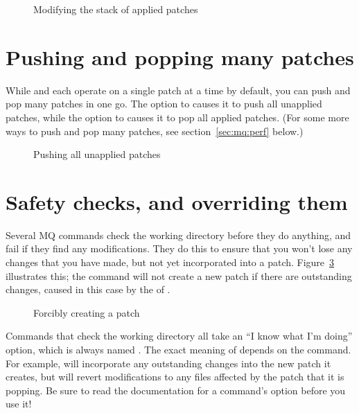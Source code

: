 \begin{figure}[ht]
  \caption{Modifying the stack of applied patches}
  \label{ex:mq:qpop}
\end{figure}

\section{Pushing and popping many patches}

While  and  each operate on a single patch at
a time by default, you can push and pop many patches in one go.  The
 option to  causes it to push all
unapplied patches, while the  option to 
causes it to pop all applied patches.  (For some more ways to push and
pop many patches, see section~\ref{sec:mq:perf} below.)

\begin{figure}[ht]
  \caption{Pushing all unapplied patches}
  \label{ex:mq:qpush-a}
\end{figure}

\section{Safety checks, and overriding them}

Several MQ commands check the working directory before they do
anything, and fail if they find any modifications.  They do this to
ensure that you won't lose any changes that you have made, but not yet
incorporated into a patch.  Figure~\ref{ex:mq:add} illustrates this;
the  command will not create a new patch if there are
outstanding changes, caused in this case by the  of
.

\begin{figure}[ht]
  \caption{Forcibly creating a patch}
  \label{ex:mq:add}
\end{figure}

Commands that check the working directory all take an ``I know what
I'm doing'' option, which is always named .  The exact
meaning of  depends on the command.  For example,
 will incorporate any outstanding
changes into the new patch it creates, but
 will revert modifications to any
files affected by the patch that it is popping.  Be sure to read the
documentation for a command's  option before you use it!

